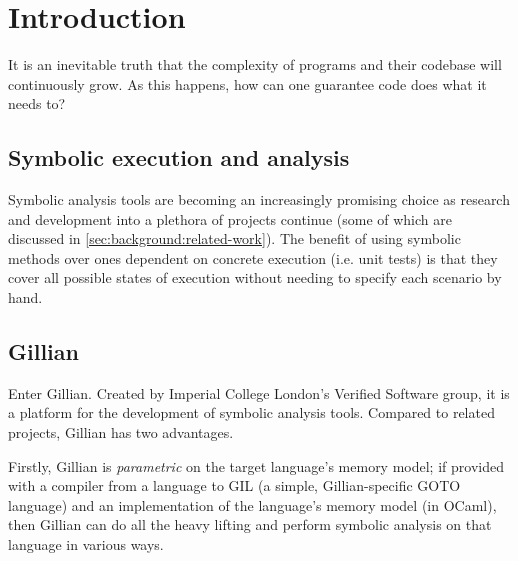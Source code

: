\chapter{Introduction}
\label{sec:intro}




It is an inevitable truth that the complexity of programs and their codebase
will continuously grow. As this happens, how can one guarantee code does what
it needs to?

\section{Symbolic execution and analysis}

Symbolic analysis tools are becoming an increasingly promising choice as
research and development into a plethora of projects continue (some of which
are discussed in \autoref{sec:background:related-work}). The benefit of using symbolic
methods over ones dependent on concrete execution (i.e. unit tests) is that
they cover all possible states of execution without needing to specify each
scenario by hand.


\section{Gillian}
Enter Gillian. Created by Imperial College London's Verified Software group, it
is a platform for the development of symbolic analysis tools. Compared to
related projects, Gillian has two advantages.

Firstly, Gillian is \textit{parametric} on the target language's memory model;
if provided with a compiler from a language to GIL (a simple, Gillian-specific
GOTO language) and an implementation of the language's memory model (in OCaml),
then Gillian can do all the heavy lifting and perform symbolic analysis on that
language in various ways\cite{gillian-part1}.

